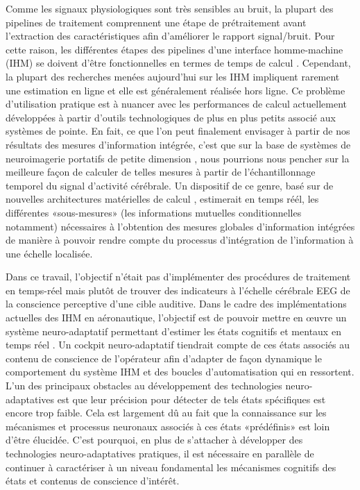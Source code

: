 Comme les signaux physiologiques sont très sensibles au bruit, la plupart des pipelines de traitement comprennent une étape de prétraitement avant l'extraction des caractéristiques afin d'améliorer le rapport signal/bruit.
Pour cette raison, les différentes étapes des pipelines d'une interface homme-machine (IHM) se doivent d'être fonctionnelles en termes de temps de calcul \citep{roy2020can}. 
Cependant, la plupart des recherches menées aujourd'hui sur les IHM impliquent rarement une estimation en ligne et elle est généralement réalisée hors ligne. 
Ce problème d'utilisation pratique est à nuancer avec les performances de calcul actuellement développées à partir d'outils technologiques de plus en plus petits associé aux systèmes de pointe. 
En fait, ce que l'on peut finalement envisager à partir de nos résultats des mesures d'information intégrée, c'est que sur la base de systèmes de neuroimagerie portatifs de petite dimension \citep{somon2020unobtrusive}, nous pourrions nous pencher sur la meilleure façon de calculer de telles mesures à partir de l'échantillonnage temporel du signal d'activité cérébrale. 
Un dispositif de ce genre, basé sur de nouvelles architectures matérielles de calcul \citep{nuno2021real}, estimerait en temps réél, les différentes «sous-mesures» (les informations mutuelles conditionnelles notamment) nécessaires à l'obtention des mesures globales d'information intégrées de manière à pouvoir rendre compte du processus d'intégration de l'information à une échelle localisée. 

Dans ce travail, l'objectif n'était pas d'implémenter des procédures de traitement en temps-réel mais plutôt de trouver des indicateurs à l'échelle cérébrale EEG de la conscience perceptive d'une cible auditive. 
Dans le cadre des implémentations actuelles des IHM en aéronautique, l'objectif est de pouvoir mettre en œuvre un système neuro-adaptatif permettant d'estimer les états cognitifs et mentaux en temps réel \citep{verdiere2019approche}. 
Un cockpit neuro-adaptatif tiendrait compte de ces états associés au contenu de conscience de l'opérateur afin d'adapter de façon dynamique le comportement du système IHM et des boucles d'automatisation qui en ressortent. 
L'un des principaux obstacles au développement des technologies neuro-adaptatives est que leur précision pour détecter de tels états spécifiques est encore trop faible.
Cela est largement dû au fait que la connaissance sur les mécanismes et processus neuronaux associés à ces états «prédéfinis» est loin d'être élucidée. 
C'est pourquoi, en plus de s'attacher à développer des technologies neuro-adaptatives pratiques, il est nécessaire en parallèle de continuer à caractériser à un niveau fondamental les mécanismes cognitifs des états et contenus de conscience d'intérêt. 

